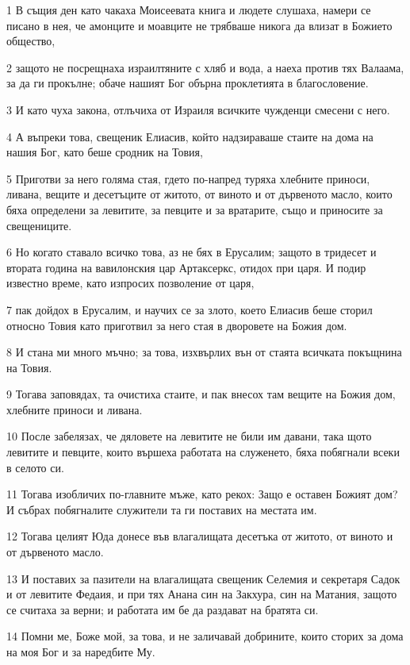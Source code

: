 \par 1 В същия ден като чакаха Моисеевата книга и людете слушаха, намери се писано в нея, че амонците и моавците не трябваше никога да влизат в Божието общество,
\par 2 защото не посрещнаха израилтяните с хляб и вода, а наеха против тях Валаама, за да ги прокълне; обаче нашият Бог обърна проклетията в благословение.
\par 3 И като чуха закона, отлъчиха от Израиля всичките чужденци смесени с него.
\par 4 А въпреки това, свещеник Елиасив, който надзираваше стаите на дома на нашия Бог, като беше сродник на Товия,
\par 5 Приготви за него голяма стая, гдето по-напред туряха хлебните приноси, ливана, вещите и десетъците от житото, от виното и от дървеното масло, които бяха определени за левитите, за певците и за вратарите, също и приносите за свещениците.
\par 6 Но когато ставало всичко това, аз не бях в Ерусалим; защото в тридесет и втората година на вавилонския цар Артаксеркс, отидох при царя. И подир известно време, като изпросих позволение от царя,
\par 7 пак дойдох в Ерусалим, и научих се за злото, което Елиасив беше сторил относно Товия като приготвил за него стая в дворовете на Божия дом.
\par 8 И стана ми много мъчно; за това, изхвърлих вън от стаята всичката покъщнина на Товия.
\par 9 Тогава заповядах, та очистиха стаите, и пак внесох там вещите на Божия дом, хлебните приноси и ливана.
\par 10 После забелязах, че дяловете на левитите не били им давани, така щото левитите и певците, които вършеха работата на служенето, бяха побягнали всеки в селото си.
\par 11 Тогава изобличих по-главните мъже, като рекох: Защо е оставен Божият дом? И събрах побягналите служители та ги поставих на местата им.
\par 12 Тогава целият Юда донесе във влагалищата десетъка от житото, от виното и от дървеното масло.
\par 13 И поставих за пазители на влагалищата свещеник Селемия и секретаря Садок и от левитите Федаия, и при тях Анана син на Закхура, син на Матания, защото се считаха за верни; и работата им бе да раздават на братята си.
\par 14 Помни ме, Боже мой, за това, и не заличавай добрините, които сторих за дома на моя Бог и за наредбите Му.
